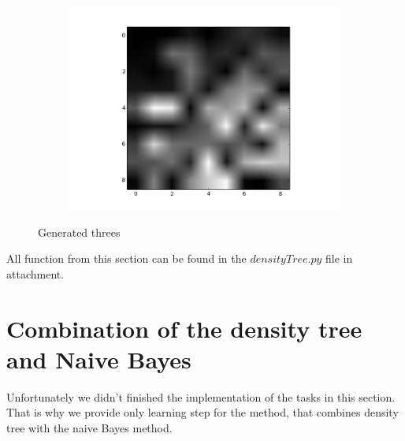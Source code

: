\documentclass{article}
\begin{document}
\begin{figure}[ht]
\begin{subfigure}[b]{0.5\textwidth}
                \includegraphics[width=\textwidth]{../new3DTn_3.png}
        \end{subfigure}        
        \caption{Generated threes}
\end{figure}

\FloatBarrier
All function from this section can be found in the $densityTree.py$ file in attachment.


\section{Combination of the density tree and Naive Bayes}
Unfortunately we didn't finished the implementation of the tasks in this section. That is why we provide only learning step for the method, that combines density tree with the naive Bayes method.
\end{document}
